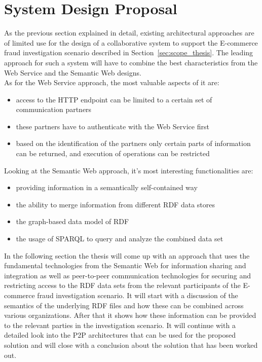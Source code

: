 
\section{System Design Proposal}
\label{sec:design_proposal}

As the previous section explained in detail, existing architectural approaches are of limited use for the design of a collaborative system to support the \gls{E-commerce} fraud investigation scenario described in Section~\ref{sec:scope_thesis}. The leading approach for such a system will have to combine the best characteristics from the Web Service and the Semantic Web designs. \\

As for the Web Service approach, the most valuable aspects of it are: \@

\begin{itemize}
	\item access to the \gls{HTTP} endpoint can be limited to a certain set of communication partners
	\item these partners have to authenticate with the Web Service first
	\item based on the identification of the partners only certain parts of information can be returned, and execution of operations can be restricted
\end{itemize}

Looking at the Semantic Web approach, it's most interesting functionalities are: \@

\begin{itemize}
	\item providing information in a semantically self-contained way
	\item the ability to merge information from different \gls{RDF} data stores
	\item the graph-based data model of \gls{RDF}
	\item the usage of \gls{SPARQL} to query and analyze the combined data set
\end{itemize}

In the following section the thesis will come up with an approach that uses the fundamental technologies from the Semantic Web for information sharing and integration as well as peer-to-peer communication technologies for securing and restricting access to the \gls{RDF} data sets from the relevant participants of the \gls{E-commerce} fraud investigation scenario. It will start with a discussion of the semantics of the underlying \gls{RDF} files and how these can be combined across various organizations. After that it shows how these information can be provided to the relevant parties in the investigation scenario. It will continue with a detailed look into the \gls{P2P} architectures that can be used for the proposed solution and will close with a conclusion about the solution that has been worked out.

